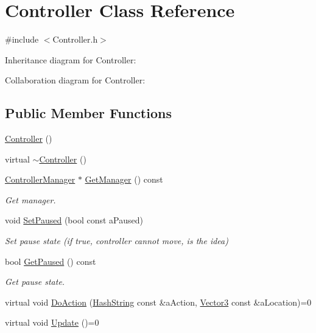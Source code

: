 \hypertarget{classController}{}\section{Controller Class Reference}
\label{classController}


{\ttfamily \#include $<$Controller.\+h$>$}



Inheritance diagram for Controller\+:


Collaboration diagram for Controller\+:
\subsection*{Public Member Functions}
\begin{DoxyCompactItemize}
\item 
\hyperlink{classController_a95c56822d667e94b031451729ce069a9}{Controller} ()
\item 
virtual \hyperlink{classController_a0ab87934c4f7a266cfdb86e0f36bc1b5}{$\sim$\+Controller} ()
\item 
\hyperlink{classControllerManager}{Controller\+Manager} $\ast$ \hyperlink{classController_a3bcbbf8e0a754251d2626a00e2aaca13}{Get\+Manager} () const 
\begin{DoxyCompactList}\small\item\em Get manager. \end{DoxyCompactList}\item 
void \hyperlink{classController_a042a6ec3615ab50d406daf4dd76275af}{Set\+Paused} (bool const a\+Paused)
\begin{DoxyCompactList}\small\item\em Set pause state (if true, controller cannot move, is the idea) \end{DoxyCompactList}\item 
bool \hyperlink{classController_a281db88cdf920b89178c6d952a563263}{Get\+Paused} () const 
\begin{DoxyCompactList}\small\item\em Get pause state. \end{DoxyCompactList}\item 
virtual void \hyperlink{classController_acd2ebbeb5634f165c6c59db178d2e609}{Do\+Action} (\hyperlink{classHashString}{Hash\+String} const \&a\+Action, \hyperlink{structVector3}{Vector3} const \&a\+Location)=0
\item 
virtual void \hyperlink{classController_aa6a687ad1d55632cc531ca1dc0c66efa}{Update} ()=0

\end{DoxyCompactItemize}
